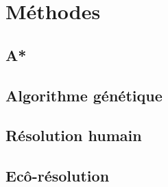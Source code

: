 \chapter{Méthodes}
    \section{A*}
    \section{Algorithme génétique}
    \section{Résolution humain}
    \section{Ecô-résolution}
